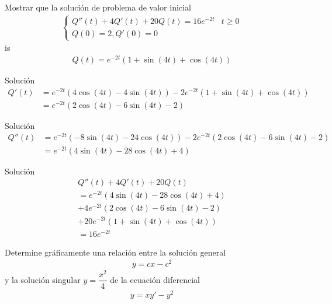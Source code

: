 
\begin{resuelto}
	Mostrar que la solución de problema de valor inicial
	\begin{align*}
		\begin{cases}
			Q''(t)+4Q'(t)+20Q(t)=16e^{-2t} & t\geq 0 \\
			Q(0) = 2, Q'(0)=0 &
		\end{cases}
	\end{align*}
	is
	\begin{align*}
		Q(t) = e^{-2t}\left(
		1+\sin(4t)+\cos(4t)
		\right)
	\end{align*}
\end{resuelto}


{Solución}
\begin{align*}
	Q'(t) &= e^{-2t}\left( 4\cos(4t)-4\sin(4t) \right)
	-2e^{-2t}\left( 1+\sin(4t)+\cos(4t) \right)\\
	&=e^{-2t}\left( 2\cos(4t)-6\sin(4t)-2 \right)
\end{align*}

{Solución}
\begin{align*}
	Q''(t) &= e^{-2t}\left( -8\sin(4t)-24\cos(4t) \right)
	-2e^{-2t}\left( 2\cos(4t)-6\sin(4t)-2 \right)\\
	& = e^{-2t}\left( 4\sin(4t)-28\cos(4t)+4 \right)
\end{align*}


{Solución}
\begin{align*}
	Q''(t)+4Q'(t)+20Q(t) \\
	=
	e^{-2t}\left( 4\sin(4t)-28\cos(4t)+4 \right) \\
	+4e^{-2t}\left( 2\cos(4t)-6\sin(4t)-2 \right) \\
	+20e^{-2t}\left(
	1+\sin(4t)+\cos(4t)
	\right) \\
	=  16e^{-2t}
\end{align*}



Determine gráficamente una relación entre la solución general
\begin{align*}
	y = cx-c^{2}
\end{align*}
y la solución singular $y=\dfrac{x^{2}}{4}$ de la ecuación diferencial
\begin{align*}
	y = xy'-y^{2}
\end{align*}


